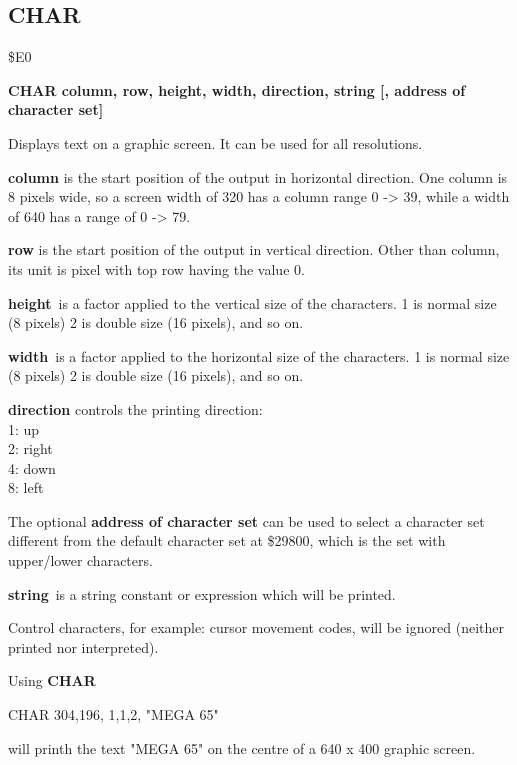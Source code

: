 \subsection{CHAR}
\begin{description}[leftmargin=3cm,style=nextline]
\item [Token:] \$E0
\item [Format:] {\bf CHAR column, row, height, width, direction, string
                [, address of character set]}
\item [Usage:]  Displays text on a graphic screen.
                It can be used for all resolutions.

                {\bf column} is the start position of the output
                in horizontal direction.
                One column is 8 pixels wide, so a screen width of 320
                has a column range 0 -> 39, while a width of 640
                has a range of 0 -> 79.

                {\bf row} is the start position of the output
                in vertical direction. Other than column, its unit is
                pixel with top row having the value 0.

                {\bf height} is a factor applied to the vertical
                size of the characters. 1 is normal size (8 pixels)
                2 is double size (16 pixels), and so on.

                {\bf width} is a factor applied to the horizontal
                size of the characters. 1 is normal size (8 pixels)
                2 is double size (16 pixels), and so on.

                {\bf direction} controls the printing direction: \\
                1: up     \\
                2: right  \\
                4: down   \\
                8: left

                The optional {\bf address of character set} can be used
                to select a character set different from the default
                character set at \$29800, which is the set with
                upper/lower characters.

                {\bf string} is a string constant or expression
                which will be printed.

\item [Remarks:]
                Control characters,
                for example: cursor movement codes, will be ignored
                (neither printed nor interpreted).


\item [Example:] Using {\bf CHAR}
\begin{screenoutput}
CHAR 304,196, 1,1,2,  "MEGA 65"
\end{screenoutput}
will printh the text "MEGA 65" on the centre of a 640 x 400 graphic screen.
\end{description}

